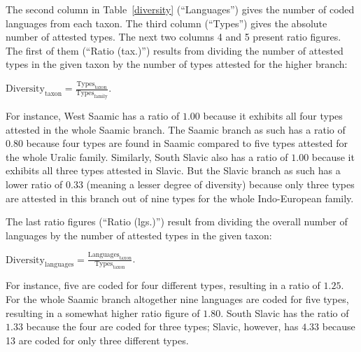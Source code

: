 The second column in Table~\ref{diversity} (“Languages”) gives the number of coded languages from each taxon. The third column (“Types”) gives the absolute number of attested types. The next two columns 4 and 5 present ratio figures. The first of them (“Ratio (tax.)”) results from dividing the number of attested types in the given taxon by the number of types attested for the higher branch:\medskip

$\text{Diversity}_{\text{taxon}} = \frac{\text{Types}_{\text{taxon}}}{\text{Types}_{\text{family}}}$.\medskip

\noindent For instance, West Saamic has a ratio of $1.00$ because it exhibits all four types attested in the whole Saamic branch. The Saamic branch as such has a ratio of $0.80$ because four types are found in Saamic compared to five types attested for the whole Uralic family. Similarly, South Slavic also has a ratio of $1.00$ because it exhibits all three types attested in Slavic. But the Slavic branch as such has a lower ratio of $0.33$ (meaning a lesser degree of diversity) because only three types are attested in this branch out of nine types for the whole Indo-European family. 

\newpage
The last ratio figures (“Ratio (lgs.)”) result from dividing the overall number of languages by the number of attested types in the given taxon:\medskip

$\text{Diversity}_{\text{languages}} = \frac{\text{Languages}_{\text{taxon}}}{\text{Types}_{\text{taxon}}}$.\medskip

\noindent For instance, five  are coded for four different types, resulting in a ratio of $1.25$. For the whole Saamic branch altogether nine languages are coded for five types, resulting in a somewhat higher ratio figure of $1.80$. South Slavic has the ratio of $1.33$ because the four  are coded for three types; Slavic, however, has $4.33$ because 13  are coded for only three different types.

